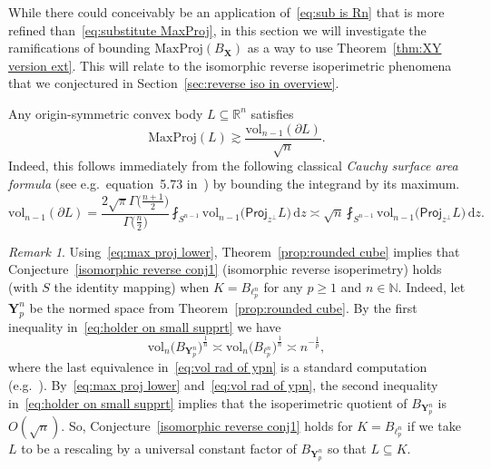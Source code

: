 \documentclass[11pt,reqno]{amsart}
\renewcommand{\ge}{\geqslant}
\newcommand{\ud}[0]{\,\mathrm{d}}
\newcommand{\proj}{\mathsf{Proj}}
\newcommand{\X}{\mathbf X}
\newcommand{\Y}{\mathbf Y}
\newcommand{\R}{\mathbb R}
\theoremstyle{remark}
\newtheorem{remark}[theorem]{Remark}
\renewcommand{\subset}{\subseteq}
\newcommand{\N}{\mathbb N}
\newcommand{\vol}{\mathrm{vol}}
\renewcommand{\1}{\mathbf 1}
\begin{document}
While there could conceivably be an application of~\eqref{eq:sub is Rn} that is more refined than~\eqref{eq:substitute MaxProj}, in this section we will investigate the ramifications of bounding  $\mathrm{MaxProj}(B_\X)$ as a way to use Theorem~\ref{thm:XY version ext}. This will relate to the isomorphic reverse isoperimetric phenomena  that we conjectured in Section~\ref{sec:reverse iso in overview}.

Any origin-symmetric convex body $L\subset \R^n$ satisfies
\begin{equation}\label{eq:max proj lower}
\mathrm{MaxProj}(L)\gtrsim \frac{\vol_{n-1}(\partial L)}{\sqrt{n}}.
\end{equation}
Indeed, this follows immediately from  the following classical  {\em Cauchy surface area formula} (see e.g.~equation~5.73 in~\cite{Sch14}) by bounding the integrand by its maximum.
\begin{equation}\label{eq:from proj to per}
\vol_{n-1}(\partial L)=\frac{2\sqrt{\pi}\Gamma\big(\frac{n+1}{2}\big)}{\Gamma\big(\frac{n}{2}\big)}\fint_{S^{n-1}} \vol_{n-1}\big(\proj_{z^\perp}L\big)\ud z\asymp \sqrt{n} \fint_{S^{n-1}} \vol_{n-1}\big(\proj_{z^\perp}L\big)\ud z.
\end{equation}

\begin{remark}\label{rem:isomorphic reverse for lpn} Using~\eqref{eq:max proj lower}, Theorem~\ref{prop:rounded cube} implies that Conjecture~\ref{isomorphic reverse conj1} (isomorphic reverse isoperimetry) holds (with $S$ the identity mapping) when $K=B_{\ell_p^n}$ for any $p\ge 1$ and $n\in \N$. Indeed, let $\Y_p^n$ be the normed space from Theorem~\ref{prop:rounded cube}. By the first inequality in~\eqref{eq:holder on small supprt} we have
\begin{equation}\label{eq:vol rad of ypn}
\vol_n\big(B_{\Y_p^n}\big)^{\frac{1}{n}}\asymp \vol_n\big(B_{\ell_p^n}\big)^{\frac{1}{n}}\asymp n^{-\frac{1}{p}},
\end{equation}
where the last equivalence in~\eqref{eq:vol rad of ypn} is a standard computation (e.g.~\cite[page~11]{Pis89}).  By~\eqref{eq:max proj lower} and~\eqref{eq:vol rad of ypn}, the second  inequality in~\eqref{eq:holder on small supprt} implies that the isoperimetric quotient of $B_{\Y_p^n}$ is $O(\sqrt{n})$. So, Conjecture~\ref{isomorphic reverse conj1} holds for $K=B_{\ell_p^n}$ if we take $L$ to be a  rescaling by a universal constant factor of $B_{\Y_p^n}$ so that $L\subset K$.
\end{remark}
\end{document}
